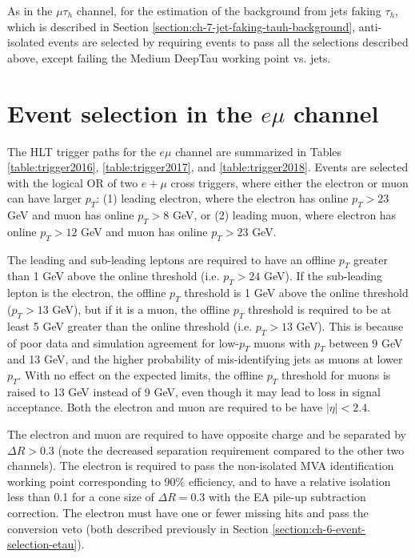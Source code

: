 As in the $\mu\tau_{h}$ channel, for the estimation of the background from jets faking $\tau_{h}$, which is described in Section \ref{section:ch-7-jet-faking-tauh-background}, anti-isolated events are selected by requiring events to pass all the selections described above, except failing the Medium DeepTau working point vs. jets.

\section{Event selection in the \texorpdfstring{$e\mu$}{emu} channel}
\label{section:ch-6-event-selection-emu}

The HLT trigger paths for the $e\mu$ channel are summarized in Tables \ref{table:trigger2016}, \ref{table:trigger2017}, and \ref{table:trigger2018}. Events are selected with the logical OR of two $e+\mu$ cross triggers, where either the electron or muon can have larger $p_{T}$: (1) leading electron, where the electron has online $p_{T} > 23$ GeV and muon has online $p_{T} > 8$ GeV, or (2) leading muon, where electron has online $p_{T} > 12$ GeV and muon has online $p_{T}>23$ GeV.

The leading and sub-leading leptons are required to have an offline $p_{T}$ greater than 1 GeV above the online threshold (i.e. $p_{T} > 24$ GeV). If the sub-leading lepton is the electron, the offline $p_{T}$ threshold is 1 GeV above the online threshold ($p_{T} > 13$ GeV), but if it is a muon, the offline $p_{T}$ threshold is required to be at least 5 GeV greater than the online threshold (i.e. $p_T > 13$ GeV). This is because of poor data and simulation agreement for low-$p_T$ muons with $p_T$ between 9 GeV and 13 GeV, and the higher probability of mis-identifying jets as muons at lower $p_{T}$. With no effect on the expected limits, the offline $p_{T}$ threshold for muons is raised to 13 GeV instead of 9 GeV, even though it may lead to loss in signal acceptance. Both the electron and muon are required to be have $|\eta| < 2.4$.

The electron and muon are required to have opposite charge and be separated by $\Delta R > 0.3$ (note the decreased separation requirement compared to the other two channels). The electron is required to pass the non-isolated MVA identification working point corresponding to 90\% efficiency, and to have a relative isolation less than 0.1 for a cone size of $\Delta R = 0.3$ with the EA pile-up subtraction correction. The electron must have one or fewer missing hits and pass the conversion veto (both described previously in Section \ref{section:ch-6-event-selection-etau}). 

